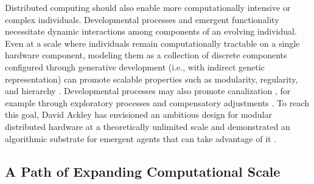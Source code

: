 Distributed computing should also enable more computationally intensive %
or complex individuals.
Developmental processes and emergent functionality necessitate dynamic interactions among components of an evolving individual. %
Even at a scale where %
individuals remain computationally tractable on a single hardware component,
modeling them as a collection of discrete components configured through generative development (i.e., with indirect genetic representation) can promote %
scalable properties \citep{lipson2007principles} such as modularity, regularity, and hierarchy \citep{hornby2005measuring, clune2011performance}.
Developmental processes may also promote canalization \citep{stanley2003taxonomy}, for example through exploratory processes and compensatory adjustments \citep{gerhart2007theory}.
To reach this goal, David Ackley has envisioned an ambitious design for modular distributed hardware at a theoretically unlimited scale \citep{ackley2011pursue} and demonstrated an algorithmic substrate for emergent agents that can take advantage of it \citep{ackley2018digital}.

\subsection{A Path of Expanding Computational Scale}


